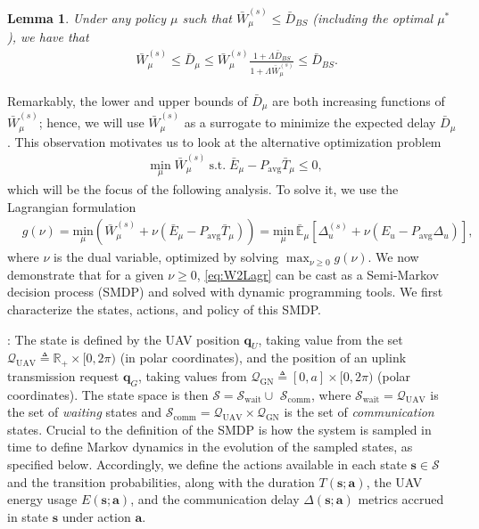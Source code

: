 \documentclass[12pt, draftcls, onecolumn]{IEEEtran}
\theoremstyle{plain}
\newtheorem{lemma}{Lemma}
\theoremstyle{definition}
\theoremstyle{remark}
\begin{document}
\begin{lemma}\label{lem:UpLowB}
Under any policy $\mu$ such that $\bar{W}_{\mu}^{(s)}{\leq}\bar{D}_{BS}$ (including the optimal $\mu^{*}$), we have that
\begin{align}\label{eq:ULBound}
    &\bar{W}_{\mu}^{(s)}\leq\bar{D}_{\mu}
    \leq \bar{W}_{\mu}^{(s)}\frac{1+\Lambda\bar{D}_{BS}}{1+\Lambda\bar{W}_{\mu}^{(s)}}
    \leq \bar{D}_{BS}.
\end{align}
\end{lemma}

Remarkably, the lower and upper bounds of $\bar{D}_{\mu}$ are both increasing functions of $\bar{W}_{\mu}^{(s)}$; hence, we will use $\bar{W}_{\mu}^{(s)}$ as a surrogate to minimize the expected delay $\bar D_\mu$. This observation motivates us to look at the alternative optimization problem
\begin{align}\label{eq:StdW2}
    &\underset{\mu}{\mathrm{min}} \; 
    \bar{W}_{\mu}^{(s)}
    \ 	\mathrm{s.t.} \; \bar{E}_{\mu}-P_{\mathrm{avg}}\bar{T}_{\mu}\leq 0,
\end{align}
which will be the focus of the following analysis. To solve it, we use the Lagrangian formulation
\begin{align}\label{eq:W2Lagr}
    &g(\nu){=}\underset{\mu}{\mathrm{min}} \left( \bar{W}_{\mu}^{(s)} + \nu (\bar{E}_{\mu}-P_{\mathrm{avg}}\bar{T}_{\mu}) \right)
    {=}\underset{\mu}{\mathrm{min}}\, \bar{\mathbb E}_\mu\left[\Delta_u^{(s)} + \nu (E_u - P_{\mathrm{avg}}\Delta_u)\right],\!\!
\end{align}
where $\nu$ is the dual variable, optimized by solving $\max_{\nu{\geq}0}g(\nu)$. We now demonstrate that for a given $\nu{\geq}0$, \eqref{eq:W2Lagr} can be cast as a Semi-Markov decision process (SMDP) and solved with dynamic programming tools. We first characterize the states, actions, and policy of this SMDP. 

: The state is defined by the UAV position $\mathbf{q}_{U}$, taking value from the set $\mathcal{Q}_{\mathrm{UAV}}\triangleq\mathbb{R}_{+}\times[0,2\pi)$ (in polar coordinates), and the position of an uplink transmission request $\mathbf{q}_G$, taking values from $\mathcal{Q}_{\mathrm{GN}}{\triangleq}[0,a]{\times}[0,2\pi)$ (polar coordinates). The state space is then $\mathcal{S}{=}\mathcal{S}_{\mathrm{wait}}{\cup}$ $\mathcal{S}_{\mathrm{comm}}$, where $\mathcal{S}_{\mathrm{wait}}{=}\mathcal{Q}_{\mathrm{UAV}}$ is the set of \emph{waiting} states and $\mathcal{S}_{\mathrm{comm}}{=}\mathcal{Q}_{\mathrm{UAV}}{\times}\mathcal{Q}_{\mathrm{GN}}$ is the set of \emph{communication} states. Crucial to the definition of the SMDP is how the system is sampled in time to define Markov dynamics in the evolution of the sampled states, as specified below. Accordingly, we define the actions available in each state $\mathbf{s}{\in}\mathcal{S}$ and the transition probabilities, along with the duration $T(\mathbf{s};\mathbf{a})$, the UAV energy usage $E(\mathbf{s};\mathbf{a})$, and the communication delay $\Delta(\mathbf{s};\mathbf{a})$ metrics accrued in state $\mathbf{s}$ under action $\mathbf{a}$.
\end{document}

